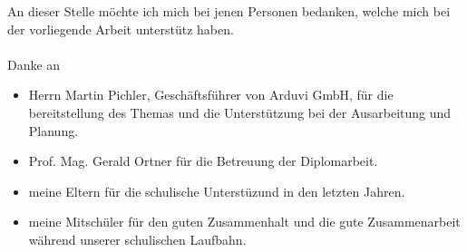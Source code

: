 An dieser Stelle möchte ich mich bei jenen Personen bedanken, welche mich bei der vorliegende Arbeit unterstütz haben.
\\\\
Danke an
\begin{itemize}
    \item Herrn Martin Pichler, Geschäftsführer von Arduvi GmbH, für die bereitstellung des Themas und 
    die Unterstützung bei der Ausarbeitung und Planung.
    \item Prof. Mag. Gerald Ortner für die Betreuung der Diplomarbeit.
    \item meine Eltern für die schulische Unterstüzund in den letzten Jahren.
    \item meine Mitschüler für den guten Zusammenhalt und die gute Zusammenarbeit während unserer schulischen Laufbahn.
\end{itemize}